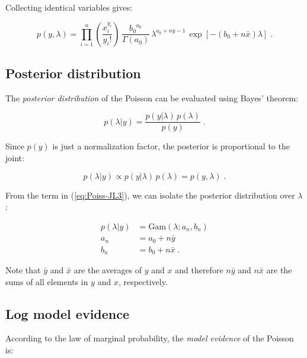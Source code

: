 Collecting identical variables gives:

\begin{equation} \label{eq:Poiss-JL3}
p(y,\lambda) = \prod_{i=1}^n \left( \frac{x_i^{y_i}}{y_i !} \right) \, \frac{{b_0}^{a_0}}{\Gamma(a_0)} \, \lambda^{a_0 + n \bar{y} - 1} \, \exp[-(b_0 + n \bar{x}) \lambda] \; .
\end{equation}


\subsection{Posterior distribution} \label{sec:Poiss-post}

The \textit{posterior distribution} of the Poisson can be evaluated using Bayes' theorem:

\begin{equation} \label{eq:Poiss-BT}
p(\lambda|y) = \frac{p(y|\lambda) \, p(\lambda)}{p(y)} \; .
\end{equation}

Since $p(y)$ is just a normalization factor, the posterior is proportional to the joint:

\begin{equation} \label{eq:Poiss-post1}
p(\lambda|y) \propto p(y|\lambda) \, p(\lambda) = p(y,\lambda) \; .
\end{equation}

From the term in (\ref{eq:Poiss-JL3}), we can isolate the posterior distribution over $\lambda$:

\vspace{-0.5em}
\begin{equation} \label{eq:Poiss-post2}
\begin{split}
p(\lambda|y) &= \mathrm{Gam}(\lambda; a_n, b_n) \\
a_n &= a_0 + n \bar{y} \\
b_n &= b_0 + n \bar{x} \; .
\end{split}
\end{equation}

Note that $\bar{y}$ and $\bar{x}$ are the averages of $y$ and $x$ and therefore $n \bar{y}$ and $n \bar{x}$ are the sums of all elements in $y$ and $x$, respectively.


\subsection{Log model evidence} \label{sec:Poiss-LME}

According to the law of marginal probability, the \textit{model evidence} of the Poisson is:

